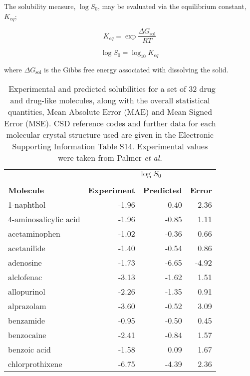 \documentclass[twoside,twocolumn,9pt]{article}
\begin{document}
The solubility measure, $\log{S_{0}}$, may be evaluated via the equilibrium constant, $K_{eq}$;

\begin{equation}
    K_{eq} = \exp{\frac{\Delta G_{\textrm{sol}}}{R T}}
\end{equation}

\begin{equation}
    \log{S_{0}} = \log_{10} K_{eq}
\end{equation}

where $\Delta G_{\textrm{sol}}$ is the Gibbs free energy associated with dissolving the solid.

\begin{table}[ht]
\small
  \caption{\ Experimental and predicted solubilities for a set of 32 drug and drug-like molecules, along with the overall statistical quantities,
  Mean Absolute Error (MAE) and Mean Signed Error (MSE). CSD reference codes and further data for each molecular crystal structure used are given in the Electronic Supporting Information Table S14. Experimental values were taken from Palmer \emph{et al.}\cite{Palmer2008}}
  \label{tab:solubilities}
  \begin{tabular*}{0.48\textwidth}{@{\extracolsep{\fill}}lrrr}
    \hline
    {} & \multicolumn{3}{c}{$\log S_0$}\\
    {} & {} & {} & {}\\
    \textbf{Molecule} & \textbf{Experiment} & \textbf{Predicted} & \textbf{Error}\\
    \hline
    1-naphthol            & -1.96 &  0.40 &  2.36\\
    4-aminosalicylic acid & -1.96 & -0.85 &  1.11\\
    acetaminophen         & -1.02 & -0.36 &  0.66\\
    acetanilide           & -1.40 & -0.54 &  0.86\\
    adenosine             & -1.73 & -6.65 & -4.92\\
    alclofenac            & -3.13 & -1.62 &  1.51\\
    allopurinol           & -2.26 & -1.35 &  0.91\\
    alprazolam            & -3.60 & -0.52 &  3.09\\
    benzamide             & -0.95 & -0.50 &  0.45\\
    benzocaine            & -2.41 & -0.84 &  1.57\\
    benzoic acid          & -1.58 &  0.09 &  1.67\\
    chlorprothixene       & -6.75 & -4.39 &  2.36\\

\end{tabular*}
\end{table}
\end{document}
